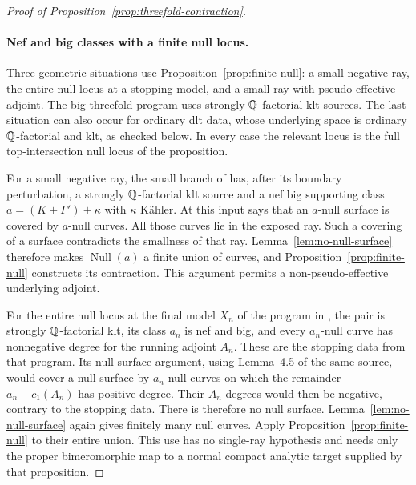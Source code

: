 \begin{proof}[Proof of Proposition~\ref{prop:threefold-contraction}]
\paragraph{Nef and big classes with a finite null locus.}
Three geometric situations use Proposition~\ref{prop:finite-null}:
a small negative ray, the entire null locus at a stopping model, and a
small ray with pseudo-effective adjoint.  The big threefold program uses
strongly \(\mathbb Q\)-factorial klt sources.  The last situation can also
occur for ordinary dlt data, whose underlying space is ordinary
\(\mathbb Q\)-factorial and klt, as checked below.  In every case the relevant
locus is the full top-intersection null locus of the proposition.

For a small negative ray, the small branch of
\cite[proof of Theorem~4.16, p.~40]{DasHacon2024} has, after its boundary
perturbation, a strongly \(\mathbb Q\)-factorial klt source and a nef big
supporting class \(a=(K+\Gamma')+\kappa\) with \(\kappa\) K\"ahler.
At this input \cite[Lemma~4.5]{DasHacon2024} says that an \(a\)-null
surface is covered by \(a\)-null curves.  All those curves lie in the
exposed ray.  Such a covering of a surface contradicts the smallness of
that ray.  Lemma~\ref{lem:no-null-surface} therefore makes
\(\operatorname{Null}(a)\) a finite union of curves, and
Proposition~\ref{prop:finite-null} constructs its contraction.
This argument permits a non-pseudo-effective underlying adjoint.

For the entire null locus at the final model \(X_n\) of the program in
\cite[Claim~6.5 and proof of Theorem~6.4, pp.~50--51]{DasHacon2024},
the pair is strongly \(\mathbb Q\)-factorial klt, its class \(a_n\) is nef
and big, and every \(a_n\)-null curve has nonnegative degree for the
running adjoint \(A_n\).  These are the stopping data from that program.
Its null-surface argument, using Lemma~4.5 of the same source, would
cover a null surface by \(a_n\)-null curves on which the remainder
\(a_n-c_1(A_n)\) has positive degree.  Their \(A_n\)-degrees would
then be negative, contrary to the stopping data.  There is therefore no
null surface.  Lemma~\ref{lem:no-null-surface} again gives finitely many
null curves.  Apply Proposition~\ref{prop:finite-null} to their entire
union.  This use has no single-ray hypothesis and needs only the proper
bimeromorphic map to a normal compact analytic target supplied by that
proposition.


\end{proof}
